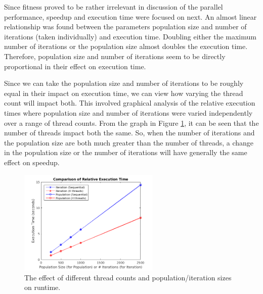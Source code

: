 \documentclass[10pt,letterpaper]{article}
\begin{document}
Since fitness proved to be rather irrelevant in discussion of the parallel performance, speedup and execution time were focused on next. An almost linear relationship was found between the parameters population size and number of iterations (taken individually) and execution time. Doubling either the maximum number of iterations or the population size almost doubles the execution time. Therefore, population size and number of iterations seem to be directly proportional in their effect on execution time.

Since we can take the population size and number of iterations to be roughly equal in their impact on execution time, we can view how varying the thread count will impact both. This involved graphical analysis of the relative execution times where population size and number of iterations were varied independently over a range of thread counts. From the graph in Figure \ref{fig:itervspop}, it can be seen that the number of threads impact both the same. So, when the number of iterations and the population size are both much greater than the number of threads, a change in the population size or the number of iterations will have generally the same effect on speedup.

\begin{figure}
\centering
\includegraphics[width=0.6\textwidth]{../img/Lenovo_Compare_ItervsPop.png}
\caption{The effect of different thread counts and population/iteration sizes on runtime.}
\label{fig:itervspop}
\end{figure}
\end{document}
